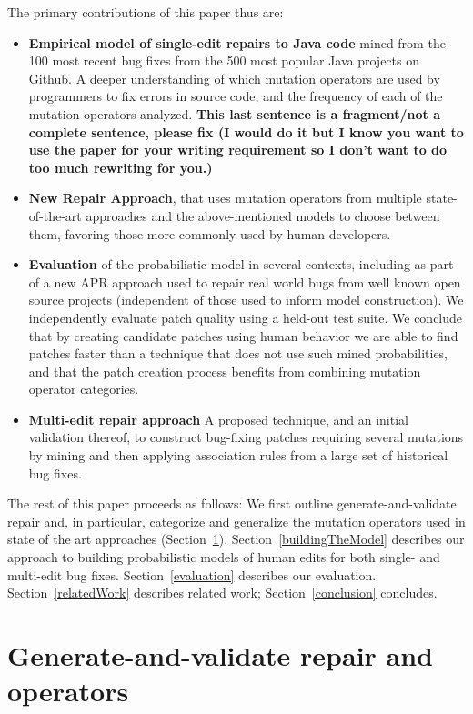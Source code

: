 \documentclass[conference]{IEEEtran}
\newcommand{\todo}[1]
  {{\scriptsize \textbf{\color{red} {#1}}}}
\begin{document}
The primary contributions of this paper thus are:
\begin{itemize}
    \item \textbf{Empirical model of single-edit repairs to Java code} mined
      from the 100 most recent bug fixes from the 500 most popular Java projects on
    Github.   A deeper
    understanding of which mutation operators are used by programmers to fix
    errors in source code, and the frequency of each of the mutation operators
    analyzed. \todo{This last sentence is a fragment/not a complete sentence,
      please fix (I would do it but I know you want to use the paper for your
      writing requirement so I don't want to do too much rewriting for you.)}
  \item \textbf{New Repair Approach}, that uses mutation operators
    from multiple state-of-the-art approaches and
    the above-mentioned models to choose between them, favoring those more commonly
    used by human developers.
  \item \textbf{Evaluation} of the probabilistic model in several
    contexts, including as part of a new APR approach used to repair real world bugs from well
    known open source projects (independent of those used to inform model
    construction). We independently evaluate patch quality using a held-out test
    suite. We conclude that by creating candidate patches using human behavior
    we are able to find patches faster than a technique that does not use such
    mined probabilities, and that the patch creation
    process benefits from combining mutation operator categories.  
  \item \textbf{Multi-edit repair approach} A proposed technique, and an initial
    validation thereof, to construct 
    bug-fixing patches requiring several mutations by mining and then applying association
    rules from a large set of historical bug fixes. 
\end{itemize}

The rest of this paper proceeds as follows: We first outline
generate-and-validate repair and, in particular, 
categorize and generalize the mutation operators used in state of the art
approaches (Section~\ref{background}). Section~\ref{buildingTheModel}
describes our approach to building probabilistic models of human 
edits for both single- and multi-edit bug fixes. Section~\ref{evaluation}
describes our evaluation. Section~\ref{relatedWork} describes
related work; Section~\ref{conclusion} concludes. 

\section{Generate-and-validate repair and operators} 
\label{background}
\end{document}
